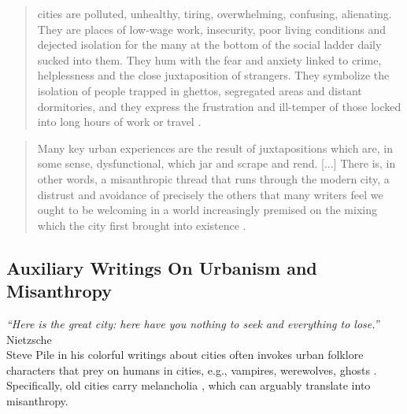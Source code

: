 \documentclass[11pt, letterpaper]{article}
\begin{document}
\begin{spacing}{1.4}
\begin{quote}
  cities are polluted,
  unhealthy, tiring, overwhelming, confusing, alienating. They are places of
  low-wage work, insecurity, poor living conditions and dejected isolation for
  the many at the bottom of the social ladder daily sucked into them. They hum
  with the fear and anxiety linked to crime, helplessness and the close
  juxtaposition of strangers. They symbolize the isolation of people trapped in
  ghettos, segregated areas and distant dormitories, and they express the
  frustration and ill-temper of those locked into long hours of work or travel \citep[][p. 1011]{amin06}.
\end{quote}
\begin{quote}
 Many key urban experiences are the result of
juxtapositions which are, in some sense, dysfunctional, which jar and scrape and
rend. [...]  %
There is, in other words, a {misanthropic} thread that runs through
the modern city, a distrust and avoidance of precisely the others that many writers feel we ought to be
welcoming in a world increasingly premised on the mixing which the city first
brought into existence \citep[][p. 140]{thrift05}.
\end{quote}


\subsection{Auxiliary Writings On Urbanism and Misanthropy}

{\small\it \noindent ``Here is the great city: here have you nothing to seek and
  everything to lose.''} Nietzsche\\

Steve Pile in his colorful writings about cities often invokes
urban folklore characters that prey on humans in cities, e.g., vampires, werewolves, ghosts  \citep{pile05,pile05B,pile99}.
%
Specifically, old cities carry melancholia \citep{pile05B}, which can arguably translate into misanthropy.
%


\end{spacing}
\end{document}
